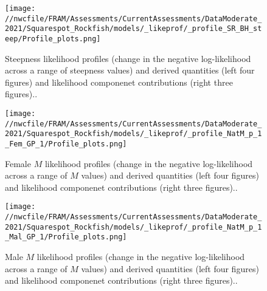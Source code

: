 \documentclass[11pt,
  english,
  a4paper,
]{article}
\begin{document}
\begin{figure}
\centering
\texttt{[image: //nwcfile/FRAM/Assessments/CurrentAssessments/DataModerate\_2021/Squarespot\_Rockfish/models/\_likeprof/\_profile\_SR\_BH\_steep/Profile\_plots.png]}
\caption{Steepness likelihood profiles (change in the negative log-likelihood across a range of steepness values) and derived quantities (left four figures) and likelihood componenet contributions (right three figures)..\label{fig:steepness-profile-combo}}
\end{figure}

\tagmcend\tagstructend


\begin{figure}
\centering
\texttt{[image: //nwcfile/FRAM/Assessments/CurrentAssessments/DataModerate\_2021/Squarespot\_Rockfish/models/\_likeprof/\_profile\_NatM\_p\_1\_Fem\_GP\_1/Profile\_plots.png]}
\caption{Female {\(M\)\leavevmode\tagmcend\tagstructend} likelihood profiles (change in the negative log-likelihood across a range of {\(M\)\leavevmode\tagmcend\tagstructend} values) and derived quantities (left four figures) and likelihood componenet contributions (right three figures)..\label{fig:M_f-profile-combo}}
\end{figure}

\tagmcend\tagstructend


\begin{figure}
\centering
\texttt{[image: //nwcfile/FRAM/Assessments/CurrentAssessments/DataModerate\_2021/Squarespot\_Rockfish/models/\_likeprof/\_profile\_NatM\_p\_1\_Mal\_GP\_1/Profile\_plots.png]}
\caption{Male {\(M\)\leavevmode\tagmcend\tagstructend} likelihood profiles (change in the negative log-likelihood across a range of {\(M\)\leavevmode\tagmcend\tagstructend} values) and derived quantities (left four figures) and likelihood componenet contributions (right three figures)..\label{fig:M_m-profile-combo}}
\end{figure}
\end{document}
